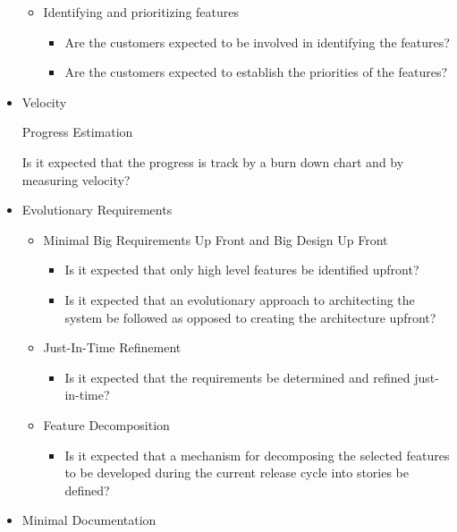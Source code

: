 \begin{appendices}
\begin{itemize}
\begin{itemize}
			\item Identifying and prioritizing features
				\begin{itemize}
					\item Are the customers expected to be involved in identifying the features?
					\item Are the customers expected to establish the priorities of the features?
				\end{itemize}
		\end{itemize}
	\item Velocity
		\begin{itemize}
			\addition Progress Estimation
				\begin{itemize}
					\addition Is it expected that the progress is track by a burn down chart and by measuring velocity?
				\end{itemize}
		\end{itemize}
	\item Evolutionary Requirements
		\begin{itemize}
			\item Minimal Big Requirements Up Front and Big Design Up Front
				\begin{itemize}
					\item Is it expected that only high level features be identified upfront?
					\item Is it expected that an evolutionary approach to architecting the system be followed as opposed to creating the architecture upfront?
				\end{itemize}
			\item Just-In-Time Refinement
				\begin{itemize}
					\item Is it expected that the requirements be determined and refined just-in-time?
				\end{itemize}
			\item Feature Decomposition
				\begin{itemize}
					\item Is it expected that a mechanism for decomposing the selected features to be developed during the current release cycle into stories be defined?
				\end{itemize}
		\end{itemize}
	\item Minimal Documentation

\end{itemize}
\end{appendices}
